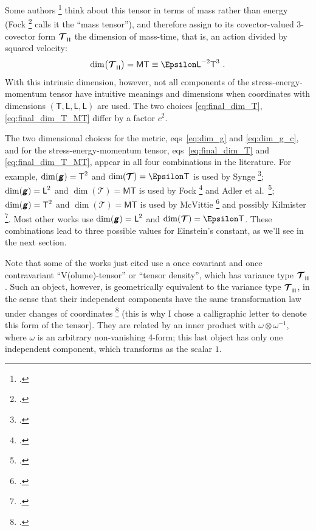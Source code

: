 \documentclass[\ifafour a4paper,12pt,\else a5paper,10pt,\fi%
onecolumn,oneside,article,%
british%
]{memoir}
\makeatletter
\theoremstyle{remark}
\theoremstyle{innote}
\newcommand*{\mathte}[1]{\textbf{\textit{\textsf{#1}}}}
\newcommand*{\citep}{\footcites}
\renewcommand*{\|}[1][]{\nonscript\,#1\vert\nonscript\;\mathopen{}}
\newcommand*{\sect}{\S}%
\newcommand*{\sects}{\S\S}%
\newcommand*{\chaps}{chs}%
\newcommand*{\eqns}{eqs}%
\newcommand*{\eg}{{e.g.}}
\newcommand*{\etal}{{et al.}}
\newcommand*{\q}{}%
\DeclareRobustCommand*{\q}{%
  \mathord{\mathpalette\bigcdot@{}}%
}
\newcommand*{\bigcdot@scalefactor}{0.7}
\newcommand*{\bigcdot@widthfactor}{1.5}
\newcommand*{\bigcdot@}[2]{%
  \sbox0{$#1\vcenter{}$}%
  \sbox2{$#1\cdot\m@th$}%
  \hbox to \bigcdot@widthfactor\wd2{%
    \hfil
    \raise\ht0\hbox{%
      \scalebox{\bigcdot@scalefactor}{%
        \lower\ht0\hbox{$#1\bullet\m@th$}%
      }%
    }%
    \hfil
  }%
}
\newcommand*{\Le}{\textsf{L}}
\newcommand*{\Ti}{\textsf{T}}
\newcommand*{\Ma}{\textsf{M}}
\newcommand*{\En}{\Epsilon}%
\newcommand*{\yg}{\mathte{g}}
\newcommand*{\yT}{\bm{\mathcal{T}}}
\renewcommand*{\i}{\indices}
\newcommand*{\rul}{{\mkern2mu\rule[-0.1ex]{0.75pt}{1.1ex}\mkern2mu}}
\DeclarePairedDelimiter\mul{\rul}{\rul}%
\makeatother
\begin{document}
\medskip

Some authors
\citep[\eg][\sect~V.55]{fock1955_t1964}[\sect~4.1]{mcvittie1956_r1965}[\sect~10.1]{adleretal1965_r1975}
think about this tensor in terms of mass rather than energy (Fock
\citep[\sect~II.31]{fock1955_t1964} calls it the \enquote{mass tensor}),
and therefore assign to its covector-valued 3-covector form
$\yT\i{_{\q \mul{\q\q\q}}}$ the dimension of mass-time, that is, an action
divided by squared velocity:
\begin{equation}
  \label{eq:final_dim_T_MT}
  \dim\bigl(\yT\i{_{\q \mul{\q\q\q}}}\bigr) = \Ma\Ti \equiv \En\Le^{-2}\Ti^{3} \ .
\end{equation}
With this intrinsic dimension, however, not all components of the
stress-energy-momentum tensor have intuitive meanings and dimensions when
coordinates with dimensions $(\Ti,\Le,\Le,\Le)$ are used. The two choices
\eqref{eq:final_dim_T}, \eqref{eq:final_dim_T_MT} differ by a factor
$c^{2}$.

\medskip

The two dimensional choices for the metric, \eqns~\eqref{eq:dim_g} and
\eqref{eq:dim_g_c}, and for the stress-energy-momentum tensor,
\eqns~\eqref{eq:final_dim_T} and \eqref{eq:final_dim_T_MT}, appear in all
four combinations in the literature. For example, $\dim(\yg)=\Ti^{2}$ and
$\dim(\yT)=\En\Ti$ is used by Synge \citep[\sects~IV.4--5]{synge1960b};
$\dim(\yg)=\Le^{2}$ and $\dim(\yT)=\Ma\Ti$ is used by Fock
\citep[\sects~V.54--55]{fock1955_t1964} and Adler \etal\
\citep[\sect~10.1]{adleretal1965_r1975}; $\dim(\yg)=\Ti^{2}$ and
$\dim(\yT)=\Ma\Ti$ is used by McVittie
\citep[\sect~4.1]{mcvittie1956_r1965} and possibly Kilmister
\citep[\chaps~II--III; he seems to shift to natural units at some
point]{kilmister1973}. Most other works use $\dim(\yg)=\Le^{2}$ and
$\dim(\yT)=\En\Ti$. These combinations lead to three possible values for
Einstein's constant, as we'll see in the next section.

\medskip

Note that some of the works just cited use a once covariant and once
contravariant \enquote{V(olume)-tensor} or \enquote{tensor density}, which
has variance type $\yT\i{_{\q}^{\q}_{\mul{\q\q\q\q}}}$. Such an object,
however, is geometrically equivalent to the variance type
$\yT\i{_{\q \mul{\q\q\q}}}$, in the sense that their independent components
have the same transformation law under changes of coordinates
\citep[\sect~II.8 p.~30]{schouten1951_r1989} (this is why I chose a
calligraphic letter to denote this form of the tensor). They are related by
an inner product with $\omega\otimes\omega^{-1}$, where $\omega$ is an
arbitrary non-vanishing 4-form; this last object has only one independent
component, which transforms as the scalar $1$.
\end{document}

